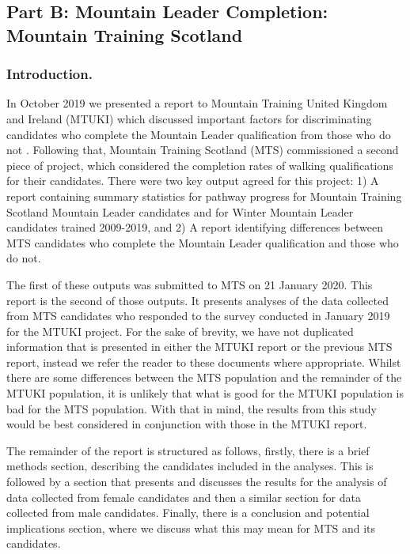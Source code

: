 \documentclass[
  12pt,
  a4paper,
]{book}
\begin{document}
\hypertarget{impact-mts-b}{%
\subsection{Part B: Mountain Leader Completion: Mountain Training Scotland}\label{impact-mts-b}}

\hypertarget{mts-part-b-introduction}{%
\subsubsection{Introduction.}\label{mts-part-b-introduction}}

In October 2019 we presented a report to Mountain Training United Kingdom and Ireland (MTUKI) which discussed important factors for discriminating candidates who complete the Mountain Leader qualification from those who do not \citep{Hardy2019b}. Following that, Mountain Training Scotland (MTS) commissioned a second piece of project, which considered the completion rates of walking qualifications for their candidates. There were two key output agreed for this project: 1) A report containing summary statistics for pathway progress for Mountain Training Scotland Mountain Leader candidates and for Winter Mountain Leader candidates trained 2009-2019, and 2) A report identifying differences between MTS candidates who complete the Mountain Leader qualification and those who do not.

The first of these outputs was submitted to MTS on 21 January 2020. This report is the second of those outputs. It presents analyses of the data collected from MTS candidates who responded to the survey conducted in January 2019 for the MTUKI project. For the sake of brevity, we have not duplicated information that is presented in either the MTUKI report or the previous MTS report, instead we refer the reader to these documents where appropriate. Whilst there are some differences between the MTS population and the remainder of the MTUKI population, it is unlikely that what is good for the MTUKI population is bad for the MTS population. With that in mind, the results from this study would be best considered in conjunction with those in the MTUKI report.

The remainder of the report is structured as follows, firstly, there is a brief methods section, describing the candidates included in the analyses. This is followed by a section that presents and discusses the results for the analysis of data collected from female candidates and then a similar section for data collected from male candidates. Finally, there is a conclusion and potential implications section, where we discuss what this may mean for MTS and its candidates.
\end{document}
